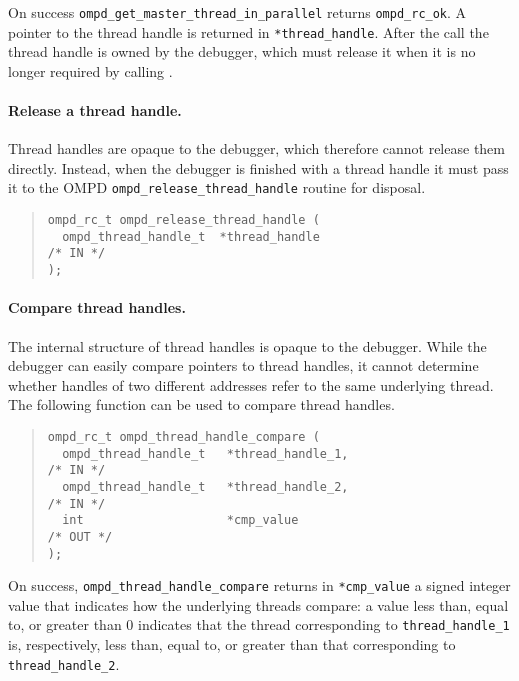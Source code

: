 On success \texttt{ompd\_get\_master\_thread\_in\_parallel}
returns \texttt{ompd\_rc\_ok}.
A pointer to the thread handle is returned in \texttt{*thread\_handle}.
After the call the thread handle is owned by the debugger,
which must release it when it is no longer required by calling
.

\paragraph{Release a thread handle.}
Thread handles are opaque to the debugger, which therefore cannot
release them directly.
Instead, when the debugger is finished with a thread handle it
must pass it to the OMPD \texttt{ompd\_release\_thread\_handle}
routine for disposal.

\begin{quote}
\begin{lstlisting}
ompd_rc_t ompd_release_thread_handle (
  ompd_thread_handle_t  *thread_handle                              /* IN */
);
\end{lstlisting}
\end{quote}

\paragraph{Compare thread handles.}
The internal structure of thread handles is opaque to the debugger.
While the debugger can easily compare pointers to thread handles,
it cannot determine whether handles of two different addresses
refer to the same underlying thread. The following function can be used to 
compare thread handles.
\begin{quote}
\begin{lstlisting}
ompd_rc_t ompd_thread_handle_compare (
  ompd_thread_handle_t   *thread_handle_1,                          /* IN */
  ompd_thread_handle_t   *thread_handle_2,                          /* IN */
  int                    *cmp_value                                /* OUT */
);
\end{lstlisting}
\end{quote}
On success, \texttt{ompd\_thread\_handle\_compare} returns in
\texttt{*cmp\_value} a signed integer value that indicates how
the underlying threads compare:
a value less than, equal to, or greater than 0 indicates that
the thread corresponding to \texttt{thread\_handle\_1} is,
respectively, less than, equal to, or greater than that corresponding
to \texttt{thread\_handle\_2}.


